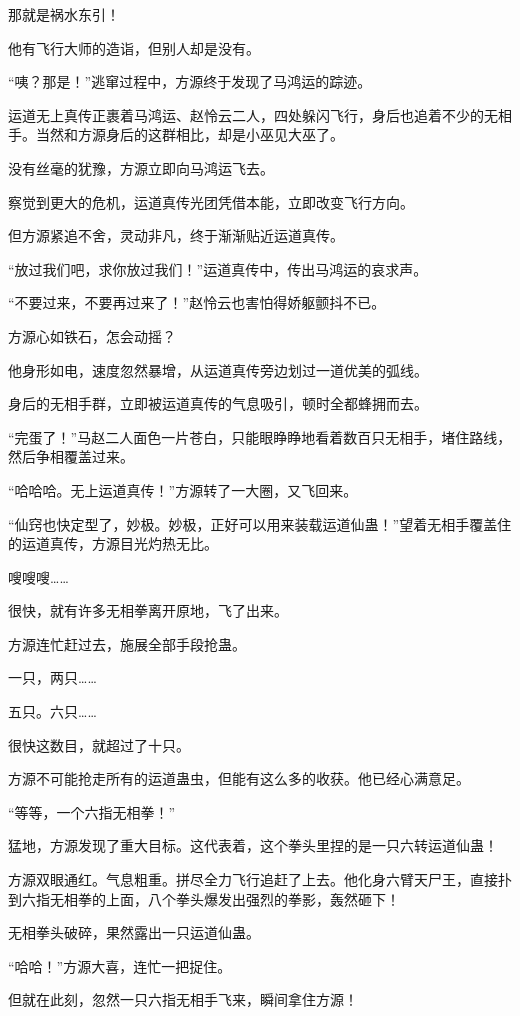 \begin{this_body}
那就是祸水东引！

他有飞行大师的造诣，但别人却是没有。

“咦？那是！”逃窜过程中，方源终于发现了马鸿运的踪迹。

运道无上真传正裹着马鸿运、赵怜云二人，四处躲闪飞行，身后也追着不少的无相手。当然和方源身后的这群相比，却是小巫见大巫了。

没有丝毫的犹豫，方源立即向马鸿运飞去。

察觉到更大的危机，运道真传光团凭借本能，立即改变飞行方向。

但方源紧追不舍，灵动非凡，终于渐渐贴近运道真传。

“放过我们吧，求你放过我们！”运道真传中，传出马鸿运的哀求声。

“不要过来，不要再过来了！”赵怜云也害怕得娇躯颤抖不已。

方源心如铁石，怎会动摇？

他身形如电，速度忽然暴增，从运道真传旁边划过一道优美的弧线。

身后的无相手群，立即被运道真传的气息吸引，顿时全都蜂拥而去。

“完蛋了！”马赵二人面色一片苍白，只能眼睁睁地看着数百只无相手，堵住路线，然后争相覆盖过来。

“哈哈哈。无上运道真传！”方源转了一大圈，又飞回来。

“仙窍也快定型了，妙极。妙极，正好可以用来装载运道仙蛊！”望着无相手覆盖住的运道真传，方源目光灼热无比。

嗖嗖嗖……

很快，就有许多无相拳离开原地，飞了出来。

方源连忙赶过去，施展全部手段抢蛊。

一只，两只……

五只。六只……

很快这数目，就超过了十只。

方源不可能抢走所有的运道蛊虫，但能有这么多的收获。他已经心满意足。

“等等，一个六指无相拳！”

猛地，方源发现了重大目标。这代表着，这个拳头里捏的是一只六转运道仙蛊！

方源双眼通红。气息粗重。拼尽全力飞行追赶了上去。他化身六臂天尸王，直接扑到六指无相拳的上面，八个拳头爆发出强烈的拳影，轰然砸下！

无相拳头破碎，果然露出一只运道仙蛊。

“哈哈！”方源大喜，连忙一把捉住。

但就在此刻，忽然一只六指无相手飞来，瞬间拿住方源！


\end{this_body}
